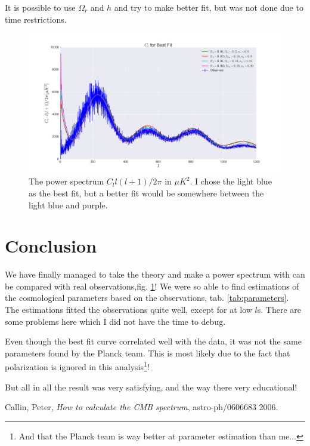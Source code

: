 \documentclass[a4paper,norsk, 10pt]{article}
\begin{document}
It is possible to use $\Omega_r$ and $h$ and try to make better fit, but was not done due to time restrictions. 


\begin{figure}[!htbp]
\centering
\includegraphics[scale=0.25]{Cl_bf.png}
\caption{The power spectrum $C_l l(l+1)/2\pi$ in $\mu K^2$. I chose the light blue as the best fit, but a better fit would be somewhere between the light blue and purple.}\label{fig:Cl_bf}
\end{figure}

\section{Conclusion}

We have finally managed to take the theory and make a power spectrum with can be compared with real observations,fig. \ref{fig:Cl_bf}! We were so able to find estimations of the cosmological parameters based on the observations, tab. \ref{tab:parameters}. The estimations fitted the observations quite well, except for at low $l$s. There are some problems here which I did not have the time to debug.

Even though the best fit curve correlated well with the data, it was not the same parameters found by the Planck team. This is most likely due to the fact that polarization is ignored in this analysis\footnote{And that the Planck team is way better at parameter estimation than me...}!

But all in all the result was very satisfying, and the way there very educational!



\begin{thebibliography}{9}

  Callin, Peter,
  \textit{How to calculate the CMB spectrum},
  astro-ph/0606683
  2006.

\end{thebibliography}
\end{document}
